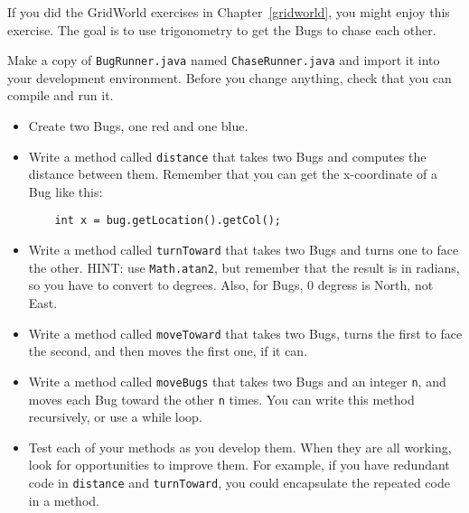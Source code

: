 \begin{exercise}

If you did the GridWorld exercises in Chapter~\ref{gridworld}, you
might enjoy this exercise.  The goal is to use trigonometry to get the
Bugs to chase each other.

Make a copy of {\tt BugRunner.java} named {\tt ChaseRunner.java} and
import it into your development environment.  Before you change
anything, check that you can compile and run it.

\begin{itemize}

\item Create two Bugs, one red and one blue.

\item Write a method called {\tt distance} that takes two Bugs
and computes the distance between them.  Remember that you can
get the x-coordinate of a Bug like this:

\begin{lstlisting}
    int x = bug.getLocation().getCol();
\end{lstlisting}

\item Write a method called {\tt turnToward} that takes two
Bugs and turns one to face the other.  HINT: use {\tt Math.atan2},
but remember that the result is in radians, so you have to
convert to degrees.  Also, for Bugs, 0 degress is North, not East.

\item Write a method called {\tt moveToward} that takes two
Bugs, turns the first to face the second, and then moves the
first one, if it can.

\item Write a method called {\tt moveBugs} that takes two Bugs
and an integer {\tt n}, and moves each Bug toward the other {\tt n}
times.  You can write this method recursively, or use a while loop.

\item Test each of your methods as you develop them.  When they are
  all working, look for opportunities to improve them.  For example,
  if you have redundant code in {\tt distance} and {\tt turnToward},
  you could encapsulate the repeated code in a method.

\end{itemize}

\end{exercise}




